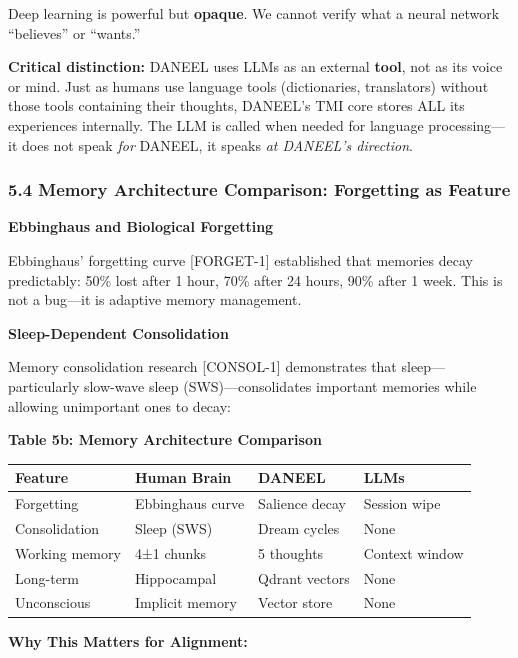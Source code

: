 \documentclass[
]{article}
\begin{document}
Deep learning is powerful but \textbf{opaque}. We cannot verify what a
neural network ``believes'' or ``wants.''

\textbf{Critical distinction:} DANEEL uses LLMs as an external
\textbf{tool}, not as its voice or mind. Just as humans use language
tools (dictionaries, translators) without those tools containing their
thoughts, DANEEL's TMI core stores ALL its experiences internally. The
LLM is called when needed for language processing---it does not speak
\emph{for} DANEEL, it speaks \emph{at DANEEL's direction}.

\hypertarget{memory-architecture-comparison-forgetting-as-feature}{%
\subsubsection{5.4 Memory Architecture Comparison: Forgetting as
Feature}\label{memory-architecture-comparison-forgetting-as-feature}}

\textbf{Ebbinghaus and Biological Forgetting}

Ebbinghaus' forgetting curve {[}FORGET-1{]} established that memories
decay predictably: 50\% lost after 1 hour, 70\% after 24 hours, 90\%
after 1 week. This is not a bug---it is adaptive memory management.

\textbf{Sleep-Dependent Consolidation}

Memory consolidation research {[}CONSOL-1{]} demonstrates that
sleep---particularly slow-wave sleep (SWS)---consolidates important
memories while allowing unimportant ones to decay:

\textbf{Table 5b: Memory Architecture Comparison}

\begin{longtable}[]{@{}llll@{}}
\toprule\noalign{}
Feature & Human Brain & DANEEL & LLMs \\
\midrule\noalign{}
\endhead
\bottomrule\noalign{}
\endlastfoot
Forgetting & Ebbinghaus curve & Salience decay & Session wipe \\
Consolidation & Sleep (SWS) & Dream cycles & None \\
Working memory & 4±1 chunks & 5 thoughts & Context window \\
Long-term & Hippocampal & Qdrant vectors & None \\
Unconscious & Implicit memory & Vector store & None \\
\end{longtable}

\textbf{Why This Matters for Alignment:}
\end{document}
